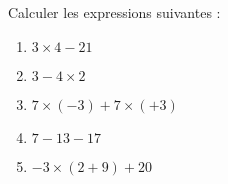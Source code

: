 
\begin{exercice}\label{exosmath-0744}

    Calculer les expressions suivantes :
    \begin{enumerate}
        \item
            \( 3\times 4-21\)
        \item
            \( 3-4\times 2\)
        \item
            \( 7\times (-3)+7\times (+3)\)
        \item
            \( 7-13-17\)
        \item
            \( -3\times (2+9)+20\)
    \end{enumerate}

\end{exercice}
